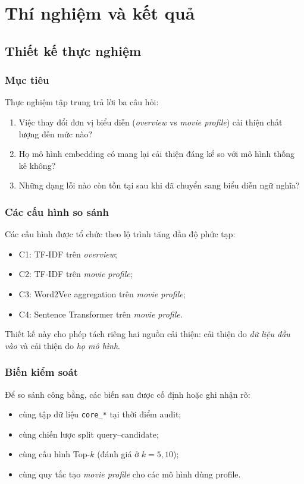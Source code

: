 \chapter{Thí nghiệm và kết quả}

\section{Thiết kế thực nghiệm}
\subsection{Mục tiêu}
Thực nghiệm tập trung trả lời ba câu hỏi:
\begin{enumerate}[label=\arabic*.]
    \item Việc thay đổi đơn vị biểu diễn (\textit{overview} vs \textit{movie profile}) cải thiện chất lượng đến mức nào?
    \item Họ mô hình embedding có mang lại cải thiện đáng kể so với mô hình thống kê không?
    \item Những dạng lỗi nào còn tồn tại sau khi đã chuyển sang biểu diễn ngữ nghĩa?
\end{enumerate}

\subsection{Các cấu hình so sánh}
Các cấu hình được tổ chức theo lộ trình tăng dần độ phức tạp:
\begin{itemize}
    \item C1: TF-IDF trên \textit{overview};
    \item C2: TF-IDF trên \textit{movie profile};
    \item C3: Word2Vec aggregation trên \textit{movie profile};
    \item C4: Sentence Transformer trên \textit{movie profile}.
\end{itemize}

Thiết kế này cho phép tách riêng hai nguồn cải thiện: cải thiện do \textit{dữ liệu đầu vào} và cải thiện do \textit{họ mô hình}.

\subsection{Biến kiểm soát}
Để so sánh công bằng, các biến sau được cố định hoặc ghi nhận rõ:
\begin{itemize}
    \item cùng tập dữ liệu \texttt{core\_*} tại thời điểm audit;
    \item cùng chiến lược split query--candidate;
    \item cùng cấu hình Top-$k$ (đánh giá ở $k=5,10$);
    \item cùng quy tắc tạo \textit{movie profile} cho các mô hình dùng profile.
\end{itemize}

